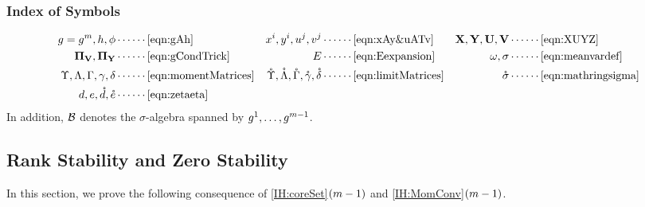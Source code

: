 \documentclass[main.tex]{subfiles}
\begin{document}
\subsubsection{Index of Symbols}
\label{sec:indexSymbols}
\begin{align*}
  g=g^{\MM}, h, \phi &\cdots\cdots \text{\cref{eqn:gAh}} &
  x^i,y^i, u^j, v^j &\cdots\cdots \text{\cref{eqn:xAy&uATv}} &
  \Xme, \Yme, \Ume, \Vme &\cdots\cdots \text{\cref{eqn:XUYZ}} \\
  \PP_\Vme, \PP_\Yme & \cdots\cdots \text{\cref{eqn:gCondTrick}} &
  E & \cdots\cdots \text{\cref{eqn:Eexpansion}} &
  \omega, \sigma &\cdots\cdots \text{\cref{eqn:meanvardef}} \\
  \Upsilonme, \Lambdame, \Gamma, \gammame, \deltame &\cdots\cdots \text{\cref{eqn:momentMatrices}} &
  \mathring\Upsilonme, \mathring\Lambdame, \mathring\Gamma, \mathring\gammame, \mathring\deltame &\cdots\cdots \text{\cref{eqn:limitMatrices}} &
  \mathring \sigma & \cdots\cdots \text{\cref{eqn:mathringsigma}}\\
  \dme, \eme, \mathring\dme, \mathring\eme &\cdots\cdots \text{\cref{eqn:zetaeta}} &
\end{align*}
In addition, $\mathcal{B}$ denotes the $\sigma$-algebra spanned by $g^1, \ldots, g^{m-1}$.

\subsection{Rank Stability and Zero Stability}
\label{sec:rankStabilityZeroStability}
In this section, we prove the following consequence of \ref{IH:coreSet}$(m-1)$ and \ref{IH:MomConv}$(m-1)$.
\end{document}

